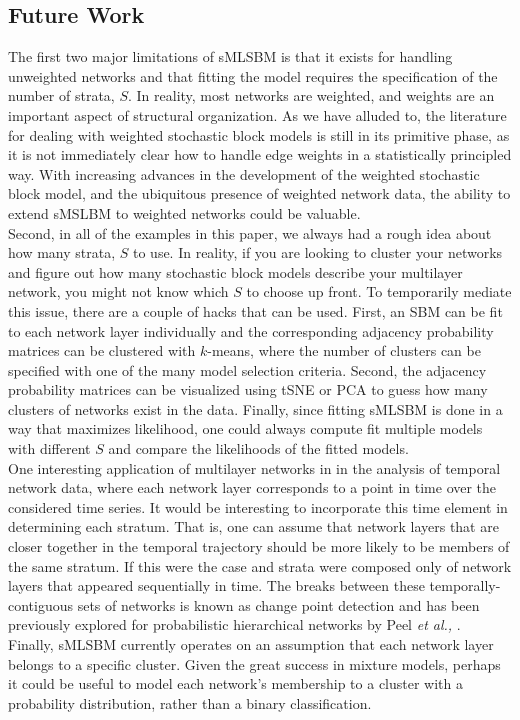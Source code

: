 \subsection{Future Work}
The first two major limitations of sMLSBM is that it exists for handling unweighted networks and that fitting the model requires the specification of the number of strata, $S$. In reality, most networks are weighted, and weights are an important aspect of structural organization. As we have alluded to, the literature for dealing with weighted stochastic block models is still in its primitive phase, as it is not immediately clear how to handle edge weights in a statistically principled way. With increasing advances in the development of the weighted stochastic block model, and the ubiquitous presence of weighted network data, the ability to extend sMSLBM to weighted networks could be valuable.\\
\indent Second, in all of the examples in this paper, we always had a rough idea about how many strata, $S$ to use. In reality, if you are looking to cluster your networks and figure out how many stochastic block models describe your multilayer network, you might not know which $S$ to choose up front. To temporarily mediate this issue, there are a couple of hacks that can be used. First, an SBM can be fit to each network layer individually and the corresponding adjacency probability matrices can be clustered with $k$-means, where the number of clusters can be specified with one of the many model selection criteria. Second, the adjacency probability matrices can be visualized using tSNE or PCA to guess how many clusters of networks exist in the data. Finally, since fitting sMLSBM is done in a way that maximizes likelihood, one could always compute fit multiple models with different $S$ and compare the likelihoods of the fitted models. \\
\indent One interesting application of multilayer networks in in the analysis of temporal network data, where each network layer corresponds to a point in time over the considered time series. It would be interesting to incorporate this time element in determining each stratum. That is, one can assume that network layers that are closer together in the temporal trajectory should be more likely to be members of the same stratum. If this were the case and strata were composed only of network layers that appeared sequentially in time. The breaks between these temporally-contiguous sets of networks is known as change point detection and has been previously explored for probabilistic hierarchical networks by Peel \emph{et al.,} \cite{peelChange}. \\
\indent Finally, sMLSBM currently operates on an assumption that each network layer belongs to a specific cluster. Given the great success in mixture models, perhaps it could be useful to model each network's membership to a cluster with a probability distribution, rather than a binary classification. 

